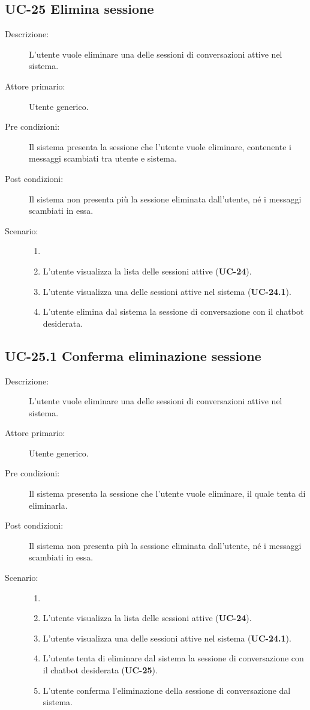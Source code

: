 \subsection{UC-25 Elimina sessione}
\begin{description}
    \item[Descrizione:] L'utente vuole eliminare una delle sessioni di conversazioni attive nel sistema.
    \item[Attore primario:] Utente generico.
    \item[Pre condizioni:] Il sistema presenta la sessione che l'utente vuole eliminare, contenente i messaggi scambiati tra utente e sistema.
    \item[Post condizioni:] Il sistema non presenta più la sessione eliminata dall'utente, né i messaggi scambiati in essa.
    \item[Scenario:] 
    \begin{enumerate}
        \item[]
        \item L'utente visualizza la lista delle sessioni attive (\textbf{UC-24}).
        \item L'utente visualizza una delle sessioni attive nel sistema (\textbf{UC-24.1}).
        \item L'utente elimina dal sistema la sessione di conversazione con il chatbot desiderata.
    \end{enumerate}
\end{description}

\subsection{UC-25.1 Conferma eliminazione sessione}
\begin{description}
    \item[Descrizione:] L'utente vuole eliminare una delle sessioni di conversazioni attive nel sistema.
    \item[Attore primario:] Utente generico.
    \item[Pre condizioni:] Il sistema presenta la sessione che l'utente vuole eliminare, il quale tenta di eliminarla.
    \item[Post condizioni:] Il sistema non presenta più la sessione eliminata dall'utente, né i messaggi scambiati in essa.
    \item[Scenario:] 
    \begin{enumerate}
        \item[]
        \item L'utente visualizza la lista delle sessioni attive (\textbf{UC-24}).
        \item L'utente visualizza una delle sessioni attive nel sistema (\textbf{UC-24.1}).
        \item L'utente tenta di eliminare dal sistema la sessione di conversazione con il chatbot desiderata (\textbf{UC-25}).
        \item L'utente conferma l'eliminazione della sessione di conversazione dal sistema.
    \end{enumerate}
\end{description}

